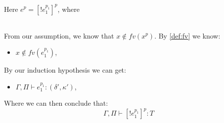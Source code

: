 \item[\runa{T-Ref-read}] Here $e^p=[!e_1^{p_1}]^p$, where
\begin{figure}[H]
	\setlength\tabcolsep{8pt}
	\begin{tabular}{l}
		
	\end{tabular}
\end{figure}

From our assumption, we know that $x\notin fv(x^p)$.
By \cref{def:fv} we know:
\begin{itemize}
	\item $x\notin fv(e_1^{p_1})$,
\end{itemize}
By our induction hypothesis we can get:
\begin{itemize}
	\item $\Gamma,\Pi\vdash e_1^{p_1}:(\delta',\kappa')$,
\end{itemize}
Where we can then conclude that:
$$\Gamma,\Pi\vdash [!e_1^{p_1}]^{p}:T$$
